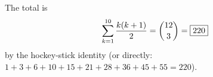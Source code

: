 The total is
\[\sum_{k=1}^{10}\dfrac{k(k+1)}{2}=\dbinom{12}{3}=\boxed{220}\]
by the hockey-stick identity (or directly: $1+3+6+10+15+21+28+36+45+55=220$).
